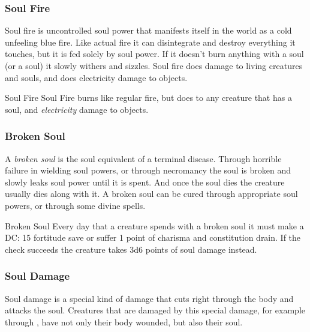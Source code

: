 \subsubsection{Soul Fire}
\label{sec:Soul Fire}

Soul fire is uncontrolled soul power that manifests itself in the world as a
cold unfeeling blue fire. Like actual fire it can disintegrate and destroy
everything it touches, but it is fed solely by soul power. If it doesn't burn
anything with a soul (or a soul) it slowly withers and sizzles. Soul fire does
damage to living creatures and souls, and does electricity damage to objects.

\begin{35e}{Soul Fire}
  Soul Fire burns like regular fire, but does  to any
  creature that has a soul, and \emph{electricity} damage to objects.
\end{35e}

\subsubsection{Broken Soul}
\label{sec:Broken Soul}


A \emph{broken soul} is the soul equivalent of a terminal disease. Through
horrible failure in wielding soul powers, or through necromancy the soul is
broken and slowly leaks soul power until it is spent. And once the soul dies
the creature usually dies along with it. A broken soul can be cured through
appropriate soul powers, or through some divine spells.

\begin{35e}{Broken Soul}
  Every day that a creature spends with a broken soul it must make a DC: 15
  fortitude save or suffer 1 point of charisma and constitution drain. If
  the check succeeds the creature takes 3d6 points of soul damage instead.
\end{35e}

\subsubsection{Soul Damage}
\label{sec:Soul Damage}

Soul damage is a special kind of damage that cuts right through the body and
attacks the soul. Creatures that are damaged by this special damage, for
example through , have not only their body wounded,
but also their soul.

